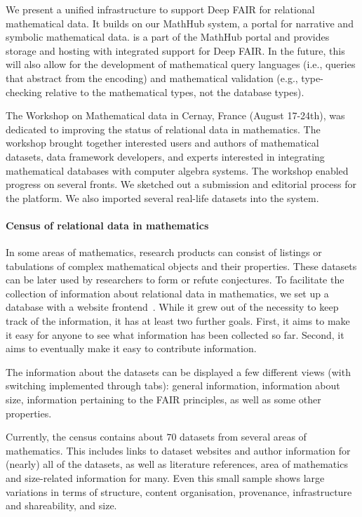 We present a unified infrastructure to support Deep FAIR for relational mathematical data.
It builds on our MathHub system, a portal for narrative and symbolic mathematical data.
\dmh is a part of the MathHub portal and provides storage and hosting with integrated support for Deep FAIR.
In the future, this will also allow for the development of mathematical query languages (i.e., queries that abstract from the encoding) and mathematical validation (e.g., type-checking relative to the mathematical types, not the database types).

The Workshop on Mathematical data in Cernay, France (August 17-24th),
was dedicated to improving the status of relational data in mathematics.
The workshop brought together interested users and authors of mathematical datasets, 
data framework developers, 
and experts interested in integrating mathematical databases with computer algebra systems.
The workshop enabled progress on several fronts.
We sketched out a submission and editorial process for the platform.
We also imported several real-life datasets into the system.

\paragraph{Census of relational data in mathematics}
In some areas of mathematics, research products can consist of
listings or tabulations of complex mathematical objects and their properties.
These datasets can be later used by researchers to form or refute conjectures.
To facilitate the collection of information about relational data in mathematics,
we set up a database with a website frontend~\cite{bercic:cmo:table}.
While it grew out of the necessity to keep track of the information, 
it has at least two further goals.
First, it aims to make it easy for anyone to see what information has been collected so far.
Second, it aims to eventually make it easy to contribute information.

The information about the datasets can be displayed a few different views
(with switching implemented through tabs): 
general information, information about size, 
information pertaining to the FAIR principles,
as well as some other properties.

Currently, the census contains about $70$ datasets from several areas of mathematics.
This includes links to dataset websites and author information for (nearly) all of the datasets,
as well as literature references, area of mathematics and size-related information for many.
Even this small sample shows large variations in terms of
structure, content organisation, provenance, infrastructure and shareability, and size.

